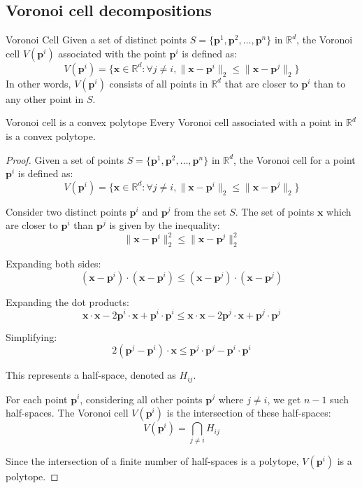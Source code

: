 \subsection{Voronoi cell decompositions}


\begin{definition}{Voronoi Cell}{}
Given a set of distinct points \(S = \{\mathbf{p}^1, \mathbf{p}^2, \dots, \mathbf{p}^n\}\) in \(\mathbb{R}^d\), the Voronoi cell \(V(\mathbf{p}^i)\) associated with the point \(\mathbf{p}^i\) is defined as:
\[ V(\mathbf{p}^i) = \{ \mathbf{x} \in \mathbb{R}^d : \forall j \neq i, \|\mathbf{x} - \mathbf{p}^i\|_2 \leq \|\mathbf{x} - \mathbf{p}^j\|_2 \} \]
In other words, \(V(\mathbf{p}^i)\) consists of all points in \(\mathbb{R}^d\) that are closer to \(\mathbf{p}^i\) than to any other point in \(S\).
\end{definition}

\begin{theorem}{Voronoi cell is a convex polytope}{}
Every Voronoi cell associated with a point in \(\mathbb{R}^d\) is a convex polytope.
\end{theorem}
\begin{proof}
Given a set of points \(S = \{\mathbf{p}^1, \mathbf{p}^2, \dots, \mathbf{p}^n\}\) in \(\mathbb{R}^d\), the Voronoi cell for a point \(\mathbf{p}^i\) is defined as:
\[ V(\mathbf{p}^i) = \{ \mathbf{x} \in \mathbb{R}^d : \forall j \neq i, \|\mathbf{x} - \mathbf{p}^i\|_2 \leq \|\mathbf{x} - \mathbf{p}^j\|_2 \} \]

Consider two distinct points \(\mathbf{p}^i\) and \(\mathbf{p}^j\) from the set \(S\). The set of points \(\mathbf{x}\) which are closer to \(\mathbf{p}^i\) than \(\mathbf{p}^j\) is given by the inequality:
\[ \|\mathbf{x} - \mathbf{p}^i\|_2^2 \leq \|\mathbf{x} - \mathbf{p}^j\|_2^2 \]

Expanding both sides:
\[ (\mathbf{x} - \mathbf{p}^i) \cdot (\mathbf{x} - \mathbf{p}^i) \leq (\mathbf{x} - \mathbf{p}^j) \cdot (\mathbf{x} - \mathbf{p}^j) \]

Expanding the dot products:
\[ \mathbf{x} \cdot \mathbf{x} - 2\mathbf{p}^i \cdot \mathbf{x} + \mathbf{p}^i \cdot \mathbf{p}^i \leq \mathbf{x} \cdot \mathbf{x} - 2\mathbf{p}^j \cdot \mathbf{x} + \mathbf{p}^j \cdot \mathbf{p}^j \]

Simplifying:
\[ 2(\mathbf{p}^j - \mathbf{p}^i) \cdot \mathbf{x} \leq \mathbf{p}^j \cdot \mathbf{p}^j - \mathbf{p}^i \cdot \mathbf{p}^i \]

This represents a half-space, denoted as \(H_{ij}\).

For each point \(\mathbf{p}^i\), considering all other points \(\mathbf{p}^j\) where \(j \neq i\), we get \(n-1\) such half-spaces. The Voronoi cell \(V(\mathbf{p}^i)\) is the intersection of these half-spaces:
\[ V(\mathbf{p}^i) = \bigcap_{j \neq i} H_{ij} \]

Since the intersection of a finite number of half-spaces is a polytope, \(V(\mathbf{p}^i)\) is a polytope.
\end{proof}

